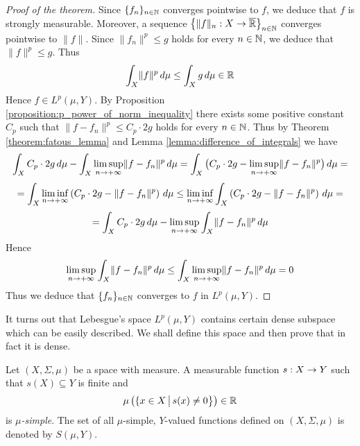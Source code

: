 \begin{proof}[Proof of the theorem]
Since $\{f_n\}_{n\in {\mathbb N}}$ converges pointwise to $f$, we deduce that $f$ is strongly measurable. Moreover, a sequence $\big\{\lVert f\rVert_n:X\rightarrow \overline{{\mathbb R}}\big\}_{n\in {\mathbb N}}$ converges pointwise to $\lVert f\rVert$. Since $\lVert f_n\rVert^p\leq g$ holds for every $n\in {\mathbb N}$, we deduce that $\lVert f\rVert^p \leq g$. Thus
$$\int_X\lVert f\rVert^p \,d\mu \leq \int_Xg\,d\mu \in {\mathbb R}$$
Hence $f\in L^p(\mu, Y)$. By Proposition \ref{proposition:p_power_of_norm_inequality} there exists some positive constant $C_p$ such that $\lVert f - f_n\rVert^p \leq C_p\cdot 2g$ holds for every $n\in {\mathbb N}$. Thus by Theorem \ref{theorem:fatous_lemma} and Lemma \ref{lemma:difference_of_integrals} we have
$$\int_XC_p\cdot 2g\,d\mu - \int_X\limsup_{n\rightarrow +\infty}\lVert f-f_n\rVert^p\,d\mu  = \int_X \big(C_p\cdot 2g - \limsup_{n\rightarrow +\infty}\lVert f-f_n\rVert^p\big)\,d\mu = $$
$$= \int_X\liminf_{n\rightarrow +\infty}\left(C_p\cdot 2g - \lVert f-f_n\rVert^p\right)\,d\mu \leq \liminf_{n\rightarrow +\infty}\int_X\left(C_p\cdot 2g - \lVert f- f_n\rVert^p\right)\,d\mu =$$
$$= \int_X C_p\cdot 2g\,d\mu - \limsup_{n\rightarrow +\infty}\int_X \lVert f-f_n\rVert^p\,d\mu $$
Hence
$$\limsup_{n\rightarrow +\infty}\int_X\lVert f - f_n\rVert^p\,d\mu \leq \int_X\limsup_{n\rightarrow +\infty}\lVert f - f_n\rVert^p\,d\mu = 0$$
Thus we deduce that $\{f_n\}_{n\in {\mathbb N}}$ converges to $f$ in $L^p(\mu,Y)$.
\end{proof}
\noindent
It turns out that Lebesgue's space $L^p(\mu, Y)$ contains certain dense subspace which can be easily described. We shall define this space and then prove that in fact it is dense.

\begin{definition}
Let $(X,\Sigma, \mu)$ be a space with measure. A measurable function $s:X\rightarrow Y$ such that $s(X)\subseteq Y$ is finite and
$$\mu\left(\{x\in X\,\big|\,s(x)\neq 0\big\}\right) \in {\mathbb R}$$
is \textit{$\mu$-simple}. The set of all $\mu$-simple, $Y$-valued functions defined on $(X,\Sigma, \mu)$ is denoted by $S(\mu, Y)$.
\end{definition}

